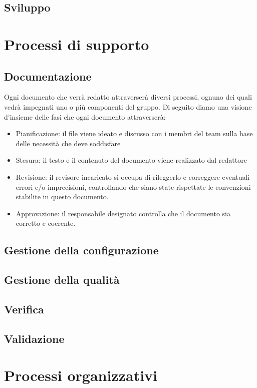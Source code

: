 \documentclass[12pt]{article}
\begin{document}
\subsection{Sviluppo}

\section{Processi di supporto}

\subsection{Documentazione}
Ogni documento che verrà redatto attraverserà diversi processi, ognuno dei quali vedrà impegnati uno o più componenti del gruppo.
Di seguito diamo una visione d'insieme delle fasi che ogni documento attraverserà:
\begin{itemize}
    \item Pianificazione: il file viene ideato e discusso con i membri del team sulla base delle necessità che deve soddisfare
    \item Stesura: il testo e il contenuto del documento viene realizzato dal redattore
    \item Revisione: il revisore incaricato si occupa di rileggerlo e correggere eventuali errori e/o imprecisioni, controllando che siano state rispettate le convenzioni stabilite in questo documento.
    \item Approvazione: il responsabile designato controlla che il documento sia corretto e coerente.
\end{itemize}

\subsection{Gestione della configurazione}
\subsection{Gestione della qualità}
\subsection{Verifica}
\subsection{Validazione}


\section{Processi organizzativi}
\end{document}
